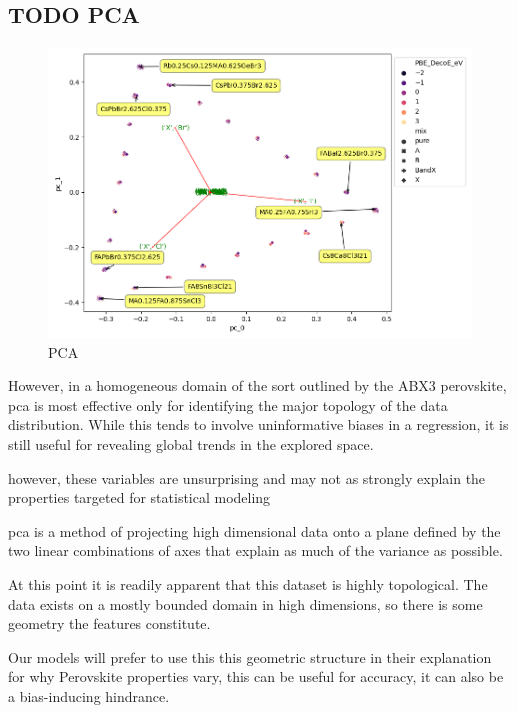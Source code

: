 \documentclass[twoside, twocolumn, 9pt, draft]{article}
\begin{document}
\subsection*{{\bfseries\sffamily TODO} PCA}
\label{sec:org3f6fb33}
\begin{figure}
\centering
\includegraphics[width=.9\linewidth]{comp_ratio_projection_annot.png}
\caption{\label{fig:pca} PCA}
\end{figure}


However, in a homogeneous domain of the sort outlined by the ABX3
perovskite, pca is most effective only for identifying the major
topology of the data distribution. While this tends to involve
uninformative biases in a regression, it is still useful for revealing
global trends in the explored space.

 however, these variables are unsurprising
and may not as strongly explain the properties targeted for
statistical modeling


\acrshort{pca} is a method of projecting high dimensional data onto
a plane defined by the two linear combinations of axes that explain as
much of the variance as possible.


At this point it is readily apparent that this dataset is highly
topological. The data exists on a mostly bounded domain in high
dimensions, so there is some geometry the features constitute.

Our models will prefer to use this this geometric structure in their
explanation for why Perovskite properties vary, this can be useful for
accuracy, it can also be a bias-inducing hindrance.
\end{document}
